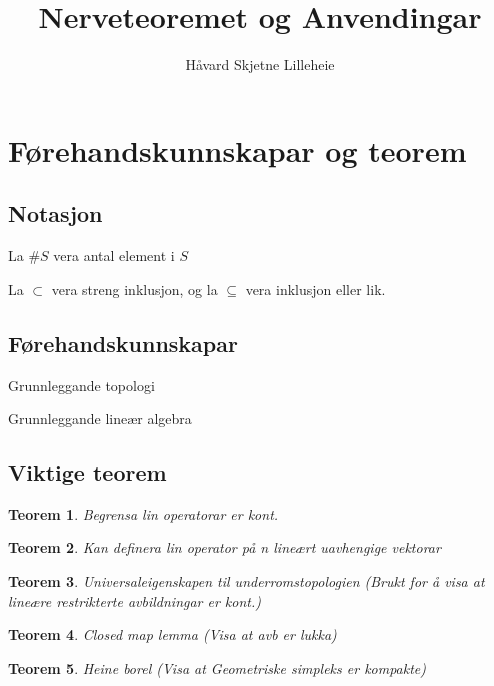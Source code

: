 \documentclass[a4paper, titlepage, 12pt, norsk]{article}
\title{Nerveteoremet og Anvendingar}
\author{Håvard Skjetne Lilleheie}
\theoremstyle{plain}
\newtheorem{theorem}{Teorem}[section]
\theoremstyle{definition}
\begin{document}
\maketitle

\section{Førehandskunnskapar og teorem}

\subsection{Notasjon}

La \( \#S \) vera antal element i \( S \)

La \( \subset \) vera streng inklusjon, og la \( \subseteq \) vera inklusjon eller lik.

\subsection{Førehandskunnskapar}

Grunnleggande topologi

Grunnleggande lineær algebra

\subsection{Viktige teorem}

\begin{theorem} \label{thm:begrensa-lin-op-er-kont}
	Begrensa lin operatorar er kont.
\end{theorem}

\begin{theorem} \label{thm:definer-lin-op}
	Kan definera lin operator på n lineært uavhengige vektorar
\end{theorem}

\begin{theorem} \label{thm:universal-eigenskap-underromstopologi}
	Universaleigenskapen til underromstopologien (Brukt for å visa at lineære restrikterte avbildningar er kont.)
\end{theorem}

\begin{theorem} \label{thm:closed-map-lemma}
	Closed map lemma (Visa at avb er lukka)
\end{theorem}

\begin{theorem}
	Heine borel (Visa at Geometriske simpleks er kompakte)
\end{theorem}
\end{document}

